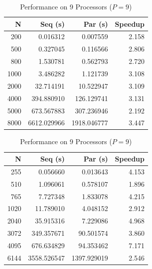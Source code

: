 \documentclass[
  12pt,
]{article}
\begin{document}
\begin{table}[h]
\centering
\begin{minipage}[t]{0.49\textwidth}
\centering
\caption{Performance on 4 Processors ($P = 4$)}
\begin{small}
\begin{tabular}{|r|r|r|r|}
\hline
\textbf{N} & \textbf{Seq (s)} & \textbf{Par (s)} & \textbf{Speedup} \\ \hline
200 & 0.016312 & 0.007559 & 2.158 \\ \hline
500 & 0.327045 & 0.116566 & 2.806 \\ \hline
800 & 1.530781 & 0.562793 & 2.720 \\ \hline
1000 & 3.486282 & 1.121739 & 3.108 \\ \hline
2000 & 32.714191 & 10.522947 & 3.109 \\ \hline
4000 & 394.880910 & 126.129741 & 3.131 \\ \hline
5000 & 673.567883 & 307.236946 & 2.192 \\ \hline
8000 & 6612.029966 & 1918.046777 & 3.447 \\ \hline
\end{tabular}
\end{small}
\end{minipage}
\hfill
\begin{minipage}[t]{0.49\textwidth}
\centering
\caption{Performance on 9 Processors ($P = 9$)}
\begin{small}
\begin{tabular}{|r|r|r|r|}
\hline
\textbf{N} & \textbf{Seq (s)} & \textbf{Par (s)} & \textbf{Speedup} \\ \hline
255 & 0.056660 & 0.013643 & 4.153 \\ \hline
510 & 1.096061 & 0.578107 & 1.896 \\ \hline
765 & 7.727348 & 1.833078 & 4.215 \\ \hline
1020 & 11.789010 & 4.048152 & 2.912 \\ \hline
2040 & 35.915316 & 7.229086 & 4.968 \\ \hline
3072 & 349.357671 & 90.501574 & 3.860 \\ \hline
4095 & 676.634829 & 94.353462 & 7.171 \\ \hline
6144 & 3558.526547 & 1397.929019 & 2.546 \\ \hline
\end{tabular}
\end{small}
\end{minipage}
\end{table}
\end{document}
